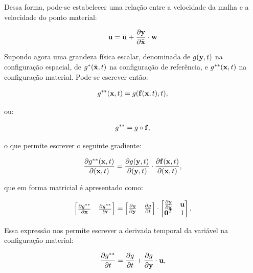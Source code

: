 \documentclass[tese_patricia]{subfiles}%
\begin{document}
Dessa forma, pode-se estabelecer uma relação entre a velocidade da malha e a velocidade do ponto material:

\begin{align}
	\mathbf{u} = \bar{\mathbf{u}} + \frac{\partial{\mathbf{y}}}{\partial{\bar{\mathbf{x}}}}\cdot \mathbf{w} \label{eq:vel_rel_mat_ALE}
\end{align}

Supondo agora uma grandeza física escalar, denominada de $g(\mathbf{y},t)$ na configuração espacial, de $g^{*}(\bar{\mathbf{x}},t)$ na configuração de referência, e $g^{**}(\mathbf{x},t)$ na configuração material. Pode-se escrever então:

\begin{align}
	g^{**}(\mathbf{x},t) = g(\mathbf{f}(\mathbf{x},t),t), 
\end{align}

\noindent ou:

\begin{align}
	g^{**} = g  \circ \mathbf{f},
\end{align}

\noindent o que permite escrever o seguinte gradiente:

\begin{align}
	\frac{\partial g^{**}(\mathbf{x},t)}{\partial (\mathbf{x},t)} = \frac{\partial g(\mathbf{y},t)}{\partial (\mathbf{y},t)} \cdot \frac{\partial \mathbf{f}(\mathbf{x},t)}{\partial (\mathbf{x},t)},
\end{align}

\noindent que em forma matricial é apresentado como:

\begin{align}
	\begin{bmatrix}
		\frac{\partial {g^{**}}}{\partial {\mathbf{x}}} & \frac{\partial {g^{**}}}{\partial t} \\
	\end{bmatrix}
	=
	\begin{bmatrix}
		\frac{\partial {g}}{\partial \mathbf{y}} & \frac{\partial {g}}{\partial t} 
	\end{bmatrix}
	\cdot
	\begin{bmatrix}
		\frac{\partial {\mathbf{y}}}{\partial {\mathbf{x}}} & \mathbf{u} \\
		\mathbf{0}^T & 1 \\
	\end{bmatrix} .
\end{align}

Essa expressão nos permite escrever a derivada temporal da variável na configuração material:

\begin{align}
	\frac{\partial g^{**}}{\partial t} = \frac{\partial g}{\partial t} + \frac{\partial g}{\partial \mathbf{y}} \cdot \mathbf{u}, 
\end{align}
\end{document}
